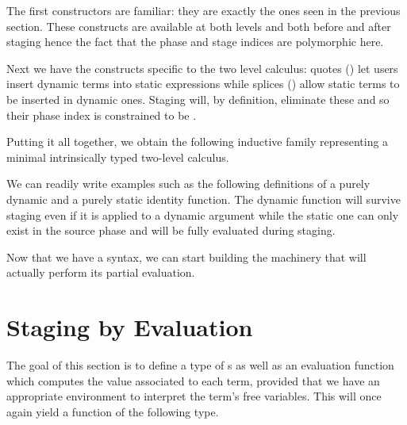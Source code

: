 
The first constructors are familiar: they are exactly the ones
seen in the previous section. These constructs are available
at both levels and both before and after staging hence the fact
that the phase and stage indices are polymorphic here.


Next we have the constructs specific to the two level calculus:
quotes () let users insert dynamic terms into static
expressions while splices () allow static terms to
be inserted in dynamic ones.
%
Staging will, by definition, eliminate these and so their phase
index is constrained to be .



Putting it all together, we obtain the following inductive
family representing a minimal intrinsically typed two-level
calculus.

\begin{AgdaAlign}
  \begin{AgdaSuppressSpace}
  \end{AgdaSuppressSpace}
\end{AgdaAlign}

We can readily write examples such as the following definitions
of a purely dynamic and a purely static identity function. The
dynamic function will survive staging even if it is applied to a
dynamic argument while the static one can only exist in the
source phase and will be fully evaluated during staging.

\noindent
\begin{minipage}{.21\textwidth}
\end{minipage}\hfill
\begin{minipage}{.23\textwidth}
\end{minipage}

Now that we have a syntax, we can start building the machinery
that will actually perform its partial evaluation.

\section{Staging by Evaluation}

The goal of this section is to define a type of s
as well as an evaluation function which computes the
value associated to each term, provided that we have an
appropriate environment to interpret the term's free variables.
%
This will once again yield a function  of the following type.

